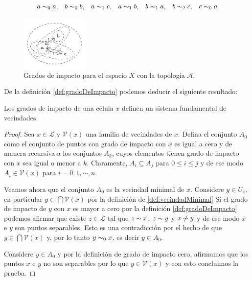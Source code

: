 $$\begin{array}{ccccccc}
    a\thicksim_0 a, & b\thicksim_0 b, & a\thicksim_1 c, & a\thicksim_1 b, &
    b\thicksim_1 a, & b\thicksim_2 c, & c\thicksim_0 a
\end{array}$$
\begin{figure}[h]
  \centering
    \includegraphics[width=0.3\textwidth]{Imagenes/grados_de_impacto.PNG}
  \caption{Grados de impacto para el espacio $X$ con la topología $\mathcal{A}$.}
  \label{fig:gradoImpacto}
\end{figure}

De la definición \ref{def:gradoDeImpacto} podemos deducir el siguiente resultado:

\begin{teorema}\label{teo:gradeosDeImpactoImplicaSFV}
Los grados de impacto de una célula $x$ definen un sistema fundamental de vecindades.
\end{teorema}
\begin{proof}
Sea $x\in\mathcal{L}$ y $\mathcal{V}(x)$ una familia de vecindades de $x$. Defina el conjunto $A_0$ como el conjunto de puntos con grado de impacto con $x$ es igual a cero y de manera recursiva a los conjuntos $A_k$, cuyos elementos tienen grado de impacto con $x$ sea igual o menor a $k$. Claramente, $A_i\subseteq A_j$ para $0\leq i\leq j$ y de ese modo $A_i\in\mathcal{V}(x)$ para $i=0,1,\cdots,n$.

Veamos ahora que el conjunto $A_0$ es la vecindad mínimal de $x$. Considere $y\in U_x$, en particular $y\in\bigcap\mathcal{V}(x)$ por la definición de \ref{def:vecindadMinimal} Si el grado de impacto de $y$ con $x$ es mayor a cero por la definición \ref{def:gradoDeImpacto} podemos afirmar que existe $z\in\mathcal{L}$ tal que $z\thicksim x$, $z\thicksim y$ y $x\not\thicksim y$ y de ese modo $x$ e $y$ son puntos separables. Esto es una contradicción por el hecho de que $y\in \bigcap \mathcal{V}(x)$ y, por lo tanto $y\thicksim_0 x$, es decir $y\in A_0$.

Considere $y\in A_0$ y por la definición de grado de impacto cero, afirmamos que los puntos $x$ e $y$ no son separables por lo que $y\in\mathcal{V}(x)$ y con esto concluimos la prueba.
\end{proof}

